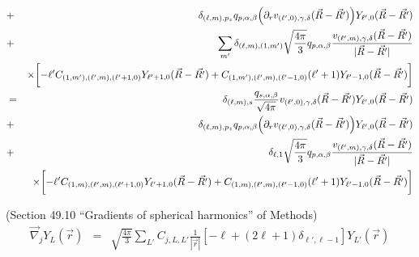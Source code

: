 \documentclass[11pt,a4paper]{report}
\begin{document}
\begin{eqnarray}
&+&
\delta_{(\ell,m),p_z}q_{p,\alpha,\beta}
\Bigl(\partial_rv_{(\ell',0),\gamma,\delta}(\vec{R}-\vec{R'}) \Bigr)
Y_{\ell',0}(\vec{R}-\vec{R'}) 
\nonumber\\
%
&+&\sum_{m'}\delta_{(\ell,m),(1,m')}\sqrt{\frac{4\pi}{3}}q_{p,\alpha,\beta}
\frac{v_{(\ell',m),\gamma,\delta}(\vec{R}-\vec{R'})}{|\vec{R}-\vec{R'}|}
\nonumber\\
&&\times\biggl[
-\ell' C_{(1,m'),(\ell',m),(\ell'+1,0)} Y_{\ell'+1,0}(\vec{R}-\vec{R'})
+C_{(1,m'),(\ell',m),(\ell'-1,0)}(\ell'+1)Y_{\ell'-1,0}(\vec{R}-\vec{R'})
\biggr]
\nonumber\\
%
%
%
&=&
\delta_{(\ell,m),s}\frac{q_{s,\alpha,\beta}}{\sqrt{4\pi}}
v_{(\ell',0),\gamma,\delta}(\vec{R}-\vec{R'}) 
Y_{\ell',0}(\vec{R}-\vec{R'})
\nonumber\\
&+&
\delta_{(\ell,m),p_z}q_{p,\alpha,\beta}
\Bigl(\partial_rv_{(\ell',0),\gamma,\delta}(\vec{R}-\vec{R'}) \Bigr)
Y_{\ell',0}(\vec{R}-\vec{R'}) 
\nonumber\\
%
&+&\delta_{\ell,1}\sqrt{\frac{4\pi}{3}}q_{p,\alpha,\beta}
\frac{v_{(\ell',m),\gamma,\delta}(\vec{R}-\vec{R'})}{|\vec{R}-\vec{R'}|}
\nonumber\\
&&\times\biggl[
-\ell' C_{(1,m),(\ell',m),(\ell'+1,0)} Y_{\ell'+1,0}(\vec{R}-\vec{R'})
+C_{(1,m),(\ell',m),(\ell'-1,0)}(\ell'+1)Y_{\ell'-1,0}(\vec{R}-\vec{R'})
\biggr]
\nonumber\\
\end{eqnarray}




(Section 49.10 ``Gradients of spherical harmonics'' of Methods)
\begin{eqnarray}
\vec{\nabla}_jY_L(\vec{r})&=&\sqrt{\frac{4\pi}{3}}\sum_{L'}
C_{j,L,L'}\frac{1}{|\vec{r}|}
\left[-\ell+(2\ell+1)\delta_{\ell',\ell-1}\right]Y_{L'}(\vec{r})
\label{eq:gradientsphericalharmonics}
\end{eqnarray}




\end{document}
